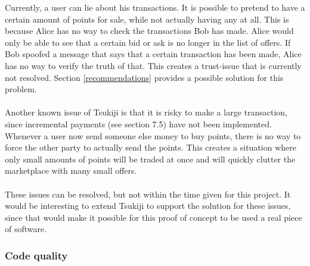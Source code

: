 Currently, a user can lie about his transactions.
It is possible to pretend to have a certain amount of points for sale, while not actually having any at all.
This is because Alice has no way to check the transactions Bob has made.
Alice would only be able to see that a certain bid or ask is no longer in the list of offers.
If Bob spoofed a message that says that a certain transaction has been made, Alice has no way to verify the truth of that.
This creates a trust-issue that is currently not resolved.
Section \ref{recommendations} provides a possible solution for this problem.\\
\\
Another known issue of Tsukiji is that it is risky to make a large transaction, since incremental payments (see section 7.5) have not been implemented.
Whenever a user now send someone else money to buy points, there is no way to force the other party to actually send the points.
This creates a situation where only small amounts of points will be traded at once and will quickly clutter the marketplace with many small offers.\\
\\
These issues can be resolved, but not within the time given for this project.
It would be interesting to extend Tsukiji to support the solution for these issues, since that would make it possible for this proof of concept to be used a real piece of software.



\subsubsection{Code quality}